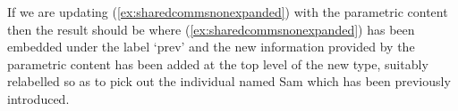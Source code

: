 If we are updating (\ref{ex:sharedcommsnonexpanded}) with the parametric
content  then the result should be \nexteg{} where
(\ref{ex:sharedcommsnonexpanded}) has been embedded under the label
`prev' and the new information provided by the parametric content has
been added at the top level of the new type, suitably relabelled so as
to pick out the individual named Sam which has been previously introduced.
\begin{ex}

\end{ex}
